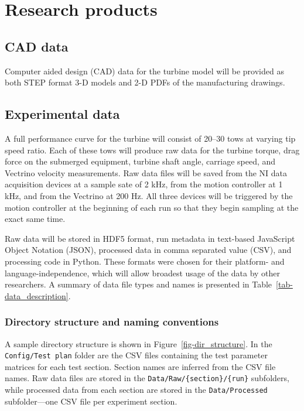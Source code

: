 \documentclass[12pt,letterpaper]{scrreprt}
\begin{document}


\chapter{Research products}

\section{CAD data}

Computer aided design (CAD) data for the turbine model will be provided as both
STEP format 3-D models and 2-D PDFs of the manufacturing drawings.

\section{Experimental data}

A full performance curve for the turbine will consist of 20--30 tows at varying
tip speed ratio. Each of these tows will produce raw data for the turbine
torque, drag force on the submerged equipment, turbine shaft angle, carriage
speed, and Vectrino velocity measurements. Raw data files will be saved from the
NI data acquisition devices at a sample sate of 2 kHz, from the motion
controller at 1 kHz, and from the Vectrino at 200 Hz. All three devices will be
triggered by the motion controller at the beginning of each run so that they
begin sampling at the exact same time.

Raw data will be stored in HDF5 format, run metadata in text-based JavaScript
Object Notation (JSON), processed data in comma separated value (CSV), and
processing code in Python. These formats were chosen for their platform- and
language-independence, which will allow broadest usage of the data by other
researchers. A summary of data file types and names is presented in
Table~\ref{tab-data_description}.


\subsection{Directory structure and naming conventions}

A sample directory structure is shown in Figure~\ref{fig-dir_structure}. In the
\texttt{Config/Test plan} folder are the CSV files containing the test parameter
matrices for each test section. Section names are inferred from the CSV file
names. Raw data files are stored in the \texttt{Data/Raw/\{section\}/\{run\}}
subfolders, while processed data from each section are stored in the
\texttt{Data/Processed} subfolder---one CSV file per experiment section.
\end{document}
